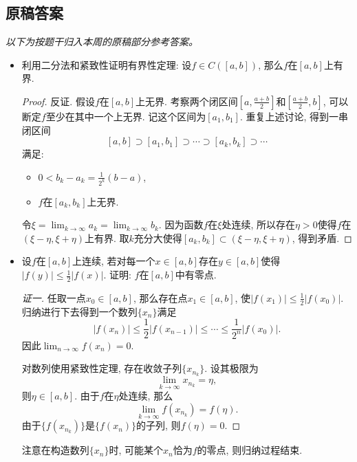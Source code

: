 \documentclass[UTF8,11pt, a4paper, oneside, fontset=none]{ctexbook}
\begin{document}
\clearpage

\subsection*{原稿答案}

\noindent\emph{以下为按题干归入本周的原稿部分参考答案。}

\begin{itemize}
\item[(1)] 利用二分法和紧致性证明有界性定理: 设$f \in C([a, b])$, 那么$f$在$[a, b]$上有界.

\begin{proof}

反证. 假设$f$在$[a, b]$上无界. 考察两个闭区间$[a, \frac{a+b}{2}]$和$[\frac{a+b}{2}, b]$, 可以断定$f$至少在其中一个上无界. 记这个区间为$[a_1, b_1]$. 重复上述讨论, 得到一串闭区间
\[
[a, b] \supset [a_1, b_1] \supset \cdots \supset [a_k, b_k] \supset \cdots
\]
满足:
\begin{itemize}
\item[(1)] $0 < b_k - a_k = \frac{1}{2^k}(b-a) $,
\item[(2)] $f$在$[a_k, b_k]$上无界.
\end{itemize}
令$\xi = \lim_{k \to \infty}a_k = \lim_{k \to \infty} b_k$. 因为函数$f$在$\xi$处连续, 所以存在$\eta>0$使得$f$在$(\xi -\eta, \xi + \eta)$上有界. 取$k$充分大使得$[a_k, b_k] \subset (\xi -\eta, \xi + \eta)$, 得到矛盾. 

\end{proof}



\item[(2)] 设$f$在$[a, b]$上连续, 若对每一个$x \in [a, b]$存在$y \in [a, b]$使得$|f(y)| \leq \frac{1}{2}|f(x)|$. 证明: $f$在$[a, b]$中有零点.


\begin{proof}[证一]
任取一点$x_0 \in [a, b]$, 那么存在点$x_1 \in [a, b]$, 使$|f(x_1)| \leq \frac{1}{2} |f(x_0)|$. 归纳进行下去得到一个数列$\{ x_n \}$满足
\[
|f(x_n)| \leq \frac{1}{2} |f(x_{n-1})| \leq \cdots \leq \frac{1}{2^n} |f(x_0)|.
\]
因此$\lim_{n \to \infty}f(x_n) =0$.


对数列使用紧致性定理, 存在收敛子列$\{ x_{n_k}\}$. 设其极限为
\[
\lim_{k \to \infty}x_{n_k} = \eta,
\]
则$\eta \in [a, b]$. 由于$f$在$\eta$处连续, 那么
\[
\lim_{k \to \infty}f(x_{n_k}) = f(\eta).
\]
由于$\{ f(x_{n_k})\}$是$\{ f(x_n)\}$的子列, 则$f(\eta)=0$.
\end{proof}


注意在构造数列$\{x_n\}$时, 可能某个$x_n$恰为$f$的零点, 则归纳过程结束.



\end{itemize}
\end{document}
